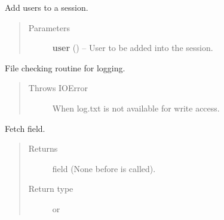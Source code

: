 \documentclass[letterpaper,10pt,english]{sphinxmanual}
\begin{document}
\begin{fulllineitems}
\begin{quote}
\begin{description}
\end{description}\end{quote}

\begin{fulllineitems}
\label{api:models.Session.addUser}
Add users to a session.
\begin{quote}\begin{description}
\item[{Parameters}] \leavevmode
\textbf{user} ({\hyperref[api:models.User]{}}) -- User to be added into the session.

\end{description}\end{quote}

\end{fulllineitems}


\begin{fulllineitems}
\label{api:models.Session.fileRoutine}
File checking routine for logging.
\begin{quote}\begin{description}
\item[{Throws IOError}] \leavevmode
When log.txt is not available for write access.

\end{description}\end{quote}

\end{fulllineitems}


\begin{fulllineitems}
\label{api:models.Session.get_last_checked}
Fetch  field.
\begin{quote}\begin{description}
\item[{Returns}] \leavevmode
{} field (None before
{\hyperref[api:models.Session.start]{}} is called).

\item[{Return type}] \leavevmode
{} or 

\end{description}\end{quote}


\end{fulllineitems}
\end{fulllineitems}
\end{document}
